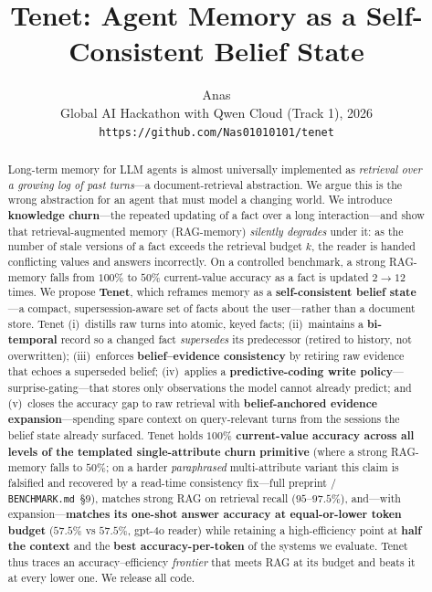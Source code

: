 \documentclass[11pt]{article}
\title{\textbf{Tenet: Agent Memory as a Self-Consistent Belief State}}
\author{Anas\\\small Global AI Hackathon with Qwen Cloud (Track 1), 2026\\
\small\texttt{https://github.com/Nas01010101/tenet}}
\date{}
\begin{document}
\maketitle

\begin{abstract}
\noindent Long-term memory for LLM agents is almost universally implemented as
\emph{retrieval over a growing log of past turns}---a document-retrieval abstraction. We
argue this is the wrong abstraction for an agent that must model a changing world. We
introduce \textbf{knowledge churn}---the repeated updating of a fact over a long
interaction---and show that retrieval-augmented memory (RAG-memory) \emph{silently
degrades} under it: as the number of stale versions of a fact exceeds the retrieval budget
$k$, the reader is handed conflicting values and answers incorrectly. On a controlled
benchmark, a strong RAG-memory falls from $100\%$ to $50\%$ current-value accuracy as a
fact is updated $2\!\to\!12$ times. We propose \textbf{Tenet}, which reframes memory as a
\textbf{self-consistent belief state}---a compact, supersession-aware set of facts about the
user---rather than a document store. Tenet (i)~distills raw turns into atomic, keyed facts; (ii)~maintains
a \textbf{bi-temporal} record so a changed fact \emph{supersedes} its predecessor (retired
to history, not overwritten); (iii)~enforces \textbf{belief--evidence consistency} by
retiring raw evidence that echoes a superseded belief; (iv)~applies a
\textbf{predictive-coding write policy}---surprise-gating---that stores only observations the
model cannot already predict; and (v)~closes the accuracy gap to raw retrieval with
\textbf{belief-anchored evidence expansion}---spending spare context on query-relevant turns
from the sessions the belief state already surfaced. Tenet holds \textbf{$100\%$ current-value
accuracy across all levels of the templated single-attribute churn primitive} (where a strong
RAG-memory falls to $50\%$; on a harder \emph{paraphrased} multi-attribute variant this claim
is falsified and recovered by a read-time consistency fix---full preprint / \texttt{BENCHMARK.md}~\S9),
matches strong
RAG on retrieval recall ($95$--$97.5\%$), and---with expansion---\textbf{matches its one-shot
answer accuracy at equal-or-lower token budget} ($57.5\%$ vs $57.5\%$, gpt-4o reader) while
retaining a high-efficiency point at \textbf{half the context} and the \textbf{best
accuracy-per-token} of the systems we evaluate. Tenet thus traces an accuracy--efficiency
\emph{frontier} that meets RAG at its budget and beats it at every lower one. We release all code.
\end{abstract}
\end{document}
